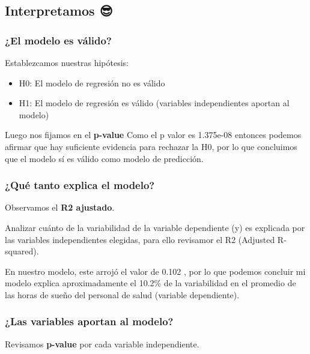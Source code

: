 \documentclass[
]{article}
\providecommand{\tightlist}{%
  \setlength{\itemsep}{0pt}\setlength{\parskip}{0pt}}
\begin{document}
\subsection{\texorpdfstring{\textbf{Interpretamos
😎}}{Interpretamos 😎}}\label{interpretamos-3}

\subsubsection{\texorpdfstring{\textbf{¿El modelo es
válido?}}{¿El modelo es válido?}}\label{el-modelo-es-vuxe1lido-3}

Establezcamos nuestras hipótesis:

\begin{itemize}
\tightlist
\item
  H0: El modelo de regresión no es válido
\item
  H1: El modelo de regresión es válido (variables independientes aportan
  al modelo)
\end{itemize}

Luego nos fijamos en el \textbf{p-value} Como el p valor es 1.375e-08
entonces podemos afirmar que hay suficiente evidencia para rechazar la
H0, por lo que concluimos que el modelo sí es válido como modelo de
predicción.

\subsubsection{\texorpdfstring{\textbf{¿Qué tanto explica el
modelo?}}{¿Qué tanto explica el modelo?}}\label{quuxe9-tanto-explica-el-modelo-3}

Observamos el \textbf{R2 ajustado}.

Analizar cuánto de la variabilidad de la variable dependiente (y) es
explicada por las variables independientes elegidas, para ello revisamor
el R2 (Adjusted R-squared).

En nuestro modelo, este arrojó el valor de 0.102 , por lo que podemos
concluir mi modelo explica aproximadamente el 10.2\% de la variabilidad
en el promedio de las horas de sueño del personal de salud (variable
dependiente).

\subsubsection{\texorpdfstring{\textbf{¿Las variables aportan al
modelo?}
🤔}{¿Las variables aportan al modelo? 🤔}}\label{las-variables-aportan-al-modelo-3}

Revisamos \textbf{p-value} por cada variable independiente.
\end{document}
